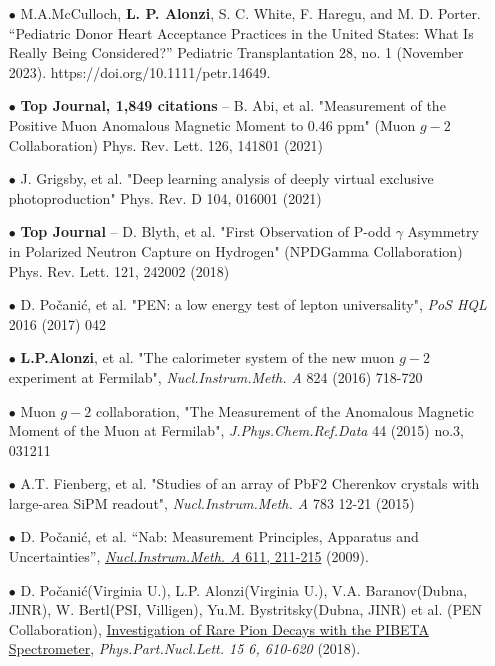 \documentclass{article}[10pt]
\begin{document}
\begin{itemize}
\item [$\bullet$] M.A.McCulloch, {\bf L. P. Alonzi}, S. C. White, F. Haregu, and M. D. Porter. “Pediatric Donor Heart Acceptance Practices in the United States: What Is Really Being Considered?” Pediatric Transplantation 28, no. 1 (November 2023). https://doi.org/10.1111/petr.14649.
\item [$\bullet$] {\bf \LARGE Top Journal, 1,849 citations} -- B. Abi, et al. "Measurement of the Positive Muon Anomalous Magnetic Moment to 0.46 ppm" (Muon $g-2$ Collaboration) Phys. Rev. Lett. 126, 141801 (2021)
\item [$\bullet$] J. Grigsby, et al. "Deep learning analysis of deeply virtual exclusive photoproduction" Phys. Rev. D 104, 016001 (2021)
\item [$\bullet$] {\bf \LARGE Top Journal} -- D. Blyth, et al. "First Observation of P-odd $\gamma$ Asymmetry in Polarized Neutron Capture on Hydrogen" (NPDGamma Collaboration) Phys. Rev. Lett. 121, 242002 (2018)
\item [$\bullet$] D. Po\v{c}ani\'c, et al. "PEN: a low energy test of lepton universality", \emph{PoS HQL} 2016 (2017) 042
\item [$\bullet$] {\bf L.P.Alonzi}, et al. "The calorimeter system of the new muon $g-2$ experiment at Fermilab", \emph{Nucl.Instrum.Meth. A} 824 (2016) 718-720
\item [$\bullet$] Muon $g-2$ collaboration, "The Measurement of the Anomalous Magnetic Moment of the Muon at Fermilab", \emph{J.Phys.Chem.Ref.Data} 44 (2015) no.3, 031211
\item [$\bullet$] A.T. Fienberg, et al. "Studies of an array of PbF2 Cherenkov crystals with large-area SiPM readout", \emph{Nucl.Instrum.Meth. A} 783 12-21 (2015)
\item [$\bullet$] D. Po\v{c}ani\'c, et al. ``Nab: Measurement Principles, Apparatus and Uncertainties'', \href{http://www.sciencedirect.com/science?_ob=ArticleURL&_udi=B6TJM-4WY6JS6-B&_user=709071&_coverDate=12/11/2009&_rdoc=1&_fmt=high&_orig=search&_origin=search&_sort=d&_docanchor=&view=c&_searchStrId=1563612201&_rerunOrigin=google&_acct=C000039638&_version=1&_urlVersion=0&_userid=709071&md5=602265f8ed1e05dbcd605115545a0871&searchtype=a}{\emph{Nucl.Instrum.Meth. A} 611, 211-215} (2009).

\item [$\bullet$] D. Počanić(Virginia U.), L.P. Alonzi(Virginia U.), V.A. Baranov(Dubna, JINR), W. Bertl(PSI, Villigen), Yu.M. Bystritsky(Dubna, JINR) et al. (PEN Collaboration), \href{https://inspirehep.net/literature/1705214}{Investigation of Rare Pion Decays with the PIBETA Spectrometer}, \emph{Phys.Part.Nucl.Lett. 15 6, 610-620} (2018).


\end{itemize}
\end{document}
